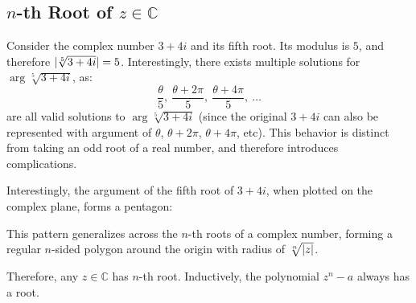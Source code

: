 \documentclass[12pt]{article}
\begin{document}
	\subsection{$n$-th Root of $z \in \mathbb{C}$}
	
	Consider the complex number $3 + 4i$ and its fifth root. Its modulus is $5$, and therefore $\lvert \sqrt[5]{3 + 4i} \rvert = 5$. Interestingly, there exists multiple solutions for $\arg \sqrt[5]{3 + 4i}$, as:
	$$\frac{\theta}{5},\ \frac{\theta + 2\pi}{5},\ \frac{\theta + 4\pi}{5},\ \dots$$
	are all valid solutions to $\arg \sqrt[5]{3 + 4i}$ (since the original $3 + 4i$ can also be represented with argument of $\theta$, $\theta + 2\pi$, $\theta + 4\pi$, etc). This behavior is distinct from taking an odd root of a real number, and therefore introduces complications.
	
	Interestingly, the argument of the fifth root of $3 + 4i$, when plotted on the complex plane, forms a pentagon:
	\begin{center}
	\end{center}
	
	This pattern generalizes across the $n$-th roots of a complex number, forming a regular $n$-sided polygon around the origin with radius of $\sqrt[n]{\lvert z \rvert}$.
	
	Therefore, any $z \in \mathbb{C}$ has $n$-th root. Inductively, the polynomial $z^n - a$ always has a root.
	
\end{document}
